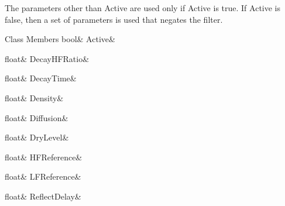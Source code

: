 The parameters other than Active are used only if Active is true. If Active is false, then a set of parameters is used that negates the filter. \begin{DoxyFields}{Class Members}
\mbox{\label{group___virtual_instrument_manager_a5696ae11db74364234cfa3a1b392478b}} 
bool&
Active&
\\
\hline

\mbox{\label{group___virtual_instrument_manager_af0b0548c6e50ca27a9c7c431536de226}} 
float&
DecayHFRatio&
\\
\hline

\mbox{\label{group___virtual_instrument_manager_a0d4f06f9eb253847d91976cf4e890f94}} 
float&
DecayTime&
\\
\hline

\mbox{\label{group___virtual_instrument_manager_a50712c619ef5aa8a29743071932f97cf}} 
float&
Density&
\\
\hline

\mbox{\label{group___virtual_instrument_manager_a7f0df133bca26a8df749cb4c8a0c2fde}} 
float&
Diffusion&
\\
\hline

\mbox{\label{group___virtual_instrument_manager_a7bd1b1132e241d4326e9391ab8725a14}} 
float&
DryLevel&
\\
\hline

\mbox{\label{group___virtual_instrument_manager_aef76135465fe5a51b9cdfb0a4c6d7b8e}} 
float&
HFReference&
\\
\hline

\mbox{\label{group___virtual_instrument_manager_a7b3168d519f1c20dac8e7c017e421d58}} 
float&
LFReference&
\\
\hline

\mbox{\label{group___virtual_instrument_manager_aca80ad03bd9dce72578cba5c10878f97}} 
float&
ReflectDelay&
\\
\hline


\end{DoxyFields}
